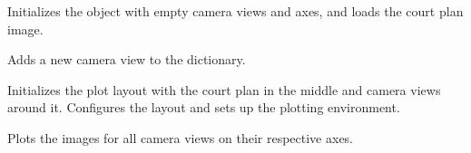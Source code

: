 \documentclass[letterpaper,10pt,english]{sphinxmanual}
\begin{document}
\begin{fulllineitems}
\begin{fulllineitems}
\begin{quote}
\begin{description}
\end{description}\end{quote}

\end{fulllineitems}


\begin{fulllineitems}
\label{\detokenize{CameraUtils:CameraUtils.PlotCameras.__init__}}
\pysigstartsignatures
{}
\pysigstopsignatures
\sphinxAtStartPar
Initializes the  object with empty camera views and axes, and loads
the court plan image.

\end{fulllineitems}


\begin{fulllineitems}
\label{\detokenize{CameraUtils:CameraUtils.PlotCameras.AddView}}
\pysigstartsignatures
{}
\pysigstopsignatures
\sphinxAtStartPar
Adds a new camera view to the  dictionary.

\end{fulllineitems}


\begin{fulllineitems}
\label{\detokenize{CameraUtils:CameraUtils.PlotCameras.InitPlot}}
\pysigstartsignatures
{}
\pysigstopsignatures
\sphinxAtStartPar
Initializes the plot layout with the court plan in the middle and camera views
around it. Configures the layout and sets up the plotting environment.

\end{fulllineitems}


\begin{fulllineitems}
\label{\detokenize{CameraUtils:CameraUtils.PlotCameras.PlotImages}}
\pysigstartsignatures
{}
\pysigstopsignatures
\sphinxAtStartPar
Plots the images for all camera views on their respective axes.


\end{fulllineitems}
\end{fulllineitems}
\end{document}
